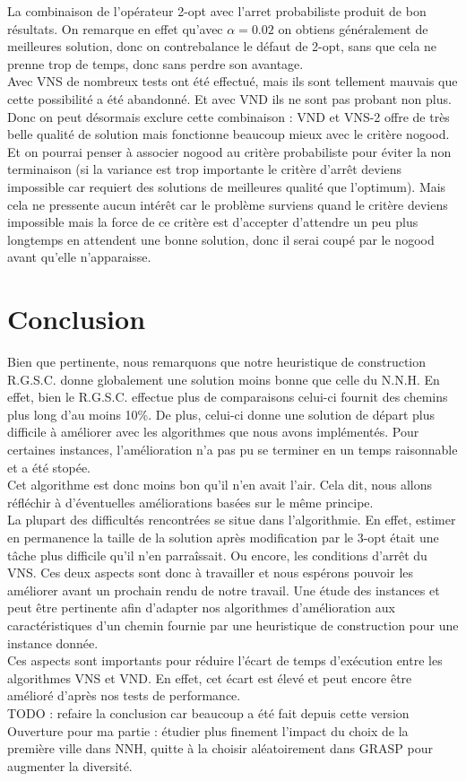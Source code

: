 \documentclass[12pt,a4paper]{article}
\begin{document}
La combinaison de l’opérateur 2-opt avec l'arret probabiliste produit de bon résultats. On remarque en effet qu'avec $\alpha = 0.02$ on obtiens généralement de meilleures solution, donc on contrebalance le défaut de 2-opt, sans que cela ne prenne trop de temps, donc sans perdre son avantage.\\

Avec VNS de nombreux tests ont été effectué, mais ils sont tellement mauvais que cette possibilité a été abandonné. Et avec VND ils ne sont pas probant non plus. Donc on peut désormais exclure cette combinaison : VND et VNS-2 offre de très belle qualité de solution mais fonctionne beaucoup mieux avec le critère nogood.\\
Et on pourrai penser à associer nogood au critère probabiliste pour éviter la non terminaison (si la variance est trop importante le critère d’arrêt deviens impossible car requiert des solutions de meilleures qualité que l'optimum). Mais cela ne pressente aucun intérêt car le problème surviens quand le critère deviens impossible mais la force de ce critère est d'accepter d'attendre un peu plus longtemps en attendent une bonne solution, donc il serai coupé par le nogood avant qu'elle n’apparaisse.\\

\section{Conclusion}
Bien que pertinente, nous remarquons que notre heuristique de construction R.G.S.C. donne globalement une solution moins bonne que celle du N.N.H. En effet, bien le R.G.S.C. effectue plus de comparaisons celui-ci fournit des chemins plus long d'au moins 10\%. De plus, celui-ci donne une solution de départ plus difficile à améliorer avec les algorithmes que nous avons implémentés. Pour certaines instances, l'amélioration n'a pas pu se terminer en un temps raisonnable et a été stopée.\\
Cet algorithme est donc moins bon qu'il n'en avait l'air. Cela dit, nous allons réfléchir à d'éventuelles améliorations basées sur le même principe.\\
La plupart des difficultés rencontrées se situe dans l'algorithmie. En effet, estimer en permanence la taille de la solution après modification par le 3-opt était une tâche plus difficile qu'il n'en parraîssait. Ou encore, les conditions d'arrêt du VNS. Ces deux aspects sont donc à travailler et nous espérons pouvoir les améliorer avant un prochain rendu de notre travail. Une étude des instances et peut être pertinente afin d'adapter nos algorithmes d'amélioration aux caractéristiques d'un chemin fournie par une heuristique de construction pour une instance donnée.\\
Ces aspects sont importants pour réduire l'écart de temps d’exécution entre les algorithmes VNS et VND. En effet, cet écart est élevé et peut encore être amélioré d'après nos tests de performance.\\

TODO : refaire la conclusion car beaucoup a été fait depuis cette version\\

Ouverture pour ma partie : étudier plus finement l'impact du choix de la première ville dans NNH, quitte à la choisir aléatoirement dans GRASP pour augmenter la diversité.
\end{document}
